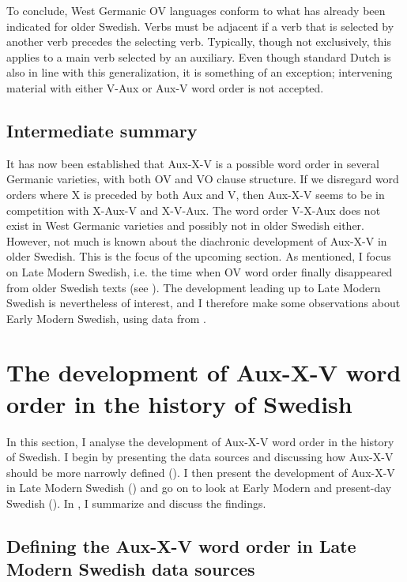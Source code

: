 \documentclass[output=paper, colorlinks, citecolor=brown]{langscibook}
\begin{document}
To conclude, West Germanic OV languages conform to what has already been indicated for older Swedish. Verbs must be adjacent if a verb that is selected by another verb precedes the selecting verb. Typically, though not exclusively, this applies to a main verb selected by an auxiliary. Even though standard Dutch is also in line with this generalization, it is something of an exception; intervening material with either V-Aux or Aux-V word order is not accepted.

\subsection{Intermediate summary}\label{sec:sangfelt:3.4}

It has now been established that Aux-X-V is a possible word order in several Germanic varieties, with both OV and VO clause structure. If we disregard word orders where X is preceded by both Aux and V, then Aux-X-V seems to be in competition with X-Aux-V and X-V-Aux. The word order V-X-Aux does not exist in West Germanic varieties and possibly not in older Swedish either. However, not much is known about the diachronic development of Aux-X-V in older Swedish. This is the focus of the upcoming section. As mentioned, I focus on Late Modern Swedish, i.e. the time when OV word order finally disappeared from older Swedish texts (see \citealt{Platzack1983,Petzell2011,Sangfelt2019}). The development leading up to Late Modern Swedish is nevertheless of interest, and I therefore make some observations about Early Modern Swedish, using data from \citet{Sangfelt2019}.

\section{The development of Aux-X-V word order in the history of Swedish}\label{sec:sangfelt:4}

In this section, I analyse the development of Aux-X-V word order in the history of Swedish. I begin by presenting the data sources and discussing how Aux-X-V should be more narrowly defined (). I then present the development of Aux-X-V in Late Modern Swedish () and go on to look at Early Modern and present-day Swedish (). In , I summarize and discuss the findings.

\subsection{Defining the Aux-X-V word order in Late Modern Swedish data sources}\label{sec:sangfelt:4.1}
\end{document}
